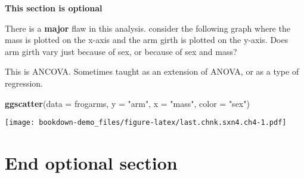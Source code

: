 \documentclass[]{book}
\newenvironment{Shaded}{\begin{snugshade}}{\end{snugshade}}
\newcommand{\KeywordTok}[1]{\textcolor[rgb]{0.13,0.29,0.53}{\textbf{#1}}}
\newcommand{\DataTypeTok}[1]{\textcolor[rgb]{0.13,0.29,0.53}{#1}}
\newcommand{\StringTok}[1]{\textcolor[rgb]{0.31,0.60,0.02}{#1}}
\newcommand{\NormalTok}[1]{#1}
\theoremstyle{definition}
\theoremstyle{definition}
\theoremstyle{definition}
\theoremstyle{remark}
\begin{document}
\textbf{This section is optional}

There is a \textbf{major} flaw in this analysis. consider the following
graph where the mass is plotted on the x-axis and the arm girth is
plotted on the y-axis. Does arm girth vary just because of sex, or
because of sex and mass?

This is ANCOVA. Sometimes taught as an extension of ANOVA, or as a type
of regression.

\begin{Shaded}
\begin{Highlighting}[]
\KeywordTok{ggscatter}\NormalTok{(}\DataTypeTok{data =}\NormalTok{ frogarms,}
          \DataTypeTok{y =} \StringTok{"arm"}\NormalTok{,}
          \DataTypeTok{x =} \StringTok{"mass"}\NormalTok{,}
          \DataTypeTok{color =} \StringTok{"sex"}\NormalTok{)}
\end{Highlighting}
\end{Shaded}

\texttt{[image: bookdown-demo\_files/figure-latex/last.chnk.sxn4.ch4-1.pdf]}

\section{\texorpdfstring{\textbf{End optional
section}}{End optional section}}\label{end-optional-section}


\end{document}
